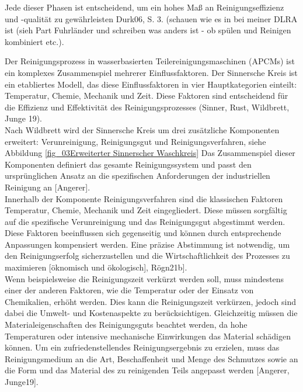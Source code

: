  Jede dieser Phasen ist entscheidend, um ein hohes Maß an Reinigungseffizienz und -qualität zu gewährleisten {Durk06, S. 3}. (schauen wie es in bei meiner DLRA ist (sieh Part Fuhrländer und schreiben was anders ist - ob spülen und Reinigen kombiniert etc.). 
 
 Der Reinigungsprozess in wasserbasierten Teilereinigungsmaschinen (APCMs) ist ein komplexes Zusammenspiel mehrerer Einflussfaktoren. Der Sinnersche Kreis ist ein etabliertes Modell, das diese Einflussfaktoren in vier Hauptkategorien einteilt: Temperatur, Chemie, Mechanik und Zeit. Diese Faktoren sind entscheidend für die Effizienz und Effektivität des Reinigungsprozesses (Sinner, Rust, Wildbrett, Junge 19).\\
 
 Nach Wildbrett wird der Sinnersche Kreis um drei zusätzliche Komponenten erweitert: Verunreinigung, Reinigungsgut und Reinigungsverfahren, siehe Abbildung \ref{fig_03Erweiterter Sinnerscher Waschkreis} Das Zusammenspiel dieser Komponenten definiert das gesamte Reinigungssystem und passt den ursprünglichen Ansatz an die spezifischen Anforderungen der industriellen Reinigung an [Angerer].\\
 
 Innerhalb der Komponente Reinigungsverfahren sind die klassischen Faktoren Temperatur, Chemie, Mechanik und Zeit eingegliedert. Diese müssen sorgfältig auf die spezifische Verunreinigung und das Reinigungsgut abgestimmt werden. Diese Faktoren beeinflussen sich gegenseitig und können durch entsprechende Anpassungen kompensiert werden. Eine präzise Abstimmung ist notwendig, um den Reinigungserfolg sicherzustellen und die Wirtschaftlichkeit des Prozesses zu maximieren [öknomisch und ökologisch], Rögn21b].\\
 
 Wenn beispielsweise die Reinigungszeit verkürzt werden soll, muss mindestens einer der anderen Faktoren, wie die Temperatur oder der Einsatz von Chemikalien, erhöht werden. Dies kann die Reinigungszeit verkürzen, jedoch sind dabei die Umwelt- und Kostenaspekte zu berücksichtigen. Gleichzeitig müssen die Materialeigenschaften des Reinigungsguts beachtet werden, da hohe Temperaturen oder intensive mechanische Einwirkungen das Material schädigen können. Um ein zufriedenstellendes Reinigungsergebnis zu erzielen, muss das Reinigungsmedium an die Art, Beschaffenheit und Menge des Schmutzes sowie an die Form und das Material des zu reinigenden Teils angepasst werden [Angerer, Junge19].\\
 
